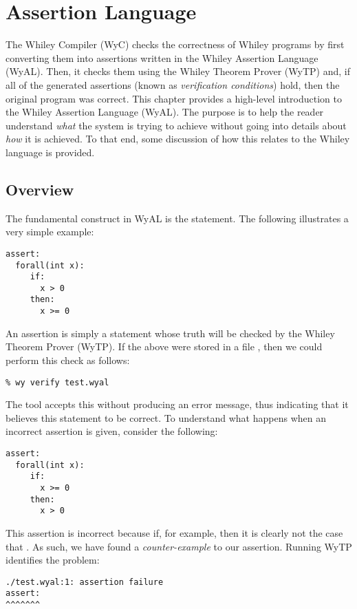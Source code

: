 \chapter{Assertion Language}

The Whiley Compiler (WyC) checks the correctness of Whiley programs by
first converting them into assertions written in the Whiley Assertion
Language (WyAL).  Then, it checks them using the Whiley Theorem Prover
(WyTP) and, if all of the generated assertions (known as {\em
  verification conditions}) hold, then the original program was
correct.  This chapter provides a high-level introduction to the
Whiley Assertion Language (WyAL).  The purpose is to help the reader
understand {\em what} the system is trying to achieve without going
into details about {\em how} it is achieved.  To that end, some
discussion of how this relates to the Whiley language is provided.

\section{Overview}
The fundamental construct in WyAL is the  statement.
The following illustrates a very simple example:
\begin{tcolorbox}\begin{lstlisting}[language=WyAL]
assert:
  forall(int x):
     if:
       x > 0
     then:
       x >= 0
\end{lstlisting}\end{tcolorbox}
An assertion is simply a statement whose truth will be checked by the
Whiley Theorem Prover (WyTP).  If the above were stored in a file
, then we could perform this check as follows:
\begin{verbatim}
% wy verify test.wyal
\end{verbatim}
The tool accepts this without producing an error message, thus
indicating that it believes this statement to be correct.  To
understand what happens when an incorrect assertion is given, consider
the following:
\begin{tcolorbox}\begin{lstlisting}[language=WyAL]
assert:
  forall(int x):
     if:
       x >= 0
     then:
       x > 0
\end{lstlisting}\end{tcolorbox}

This assertion is incorrect because if, for example,
 then it is clearly not the case that
.  As such, we have found a {\em counter-example}
to our assertion.  Running WyTP identifies the problem:
\begin{tcolorbox}\begin{lstlisting}
./test.wyal:1: assertion failure
assert:
^^^^^^^
\end{lstlisting}\end{tcolorbox}


